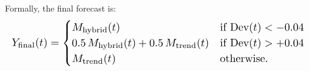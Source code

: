 \documentclass[11pt]{article}
\begin{document}
Formally, the final forecast is:
\begin{equation*}
\resizebox{\columnwidth}{!}{%
$Y_{\text{final}}(t) = \begin{cases}
M_{\text{hybrid}}(t) & \text{if } \text{Dev}(t) < -0.04 \\
0.5\, M_{\text{hybrid}}(t) + 0.5\, M_{\text{trend}}(t) & \text{if } \text{Dev}(t) > +0.04 \\
M_{\text{trend}}(t) & \text{otherwise.}
\end{cases}$%
}
\end{equation*}



\end{document}
